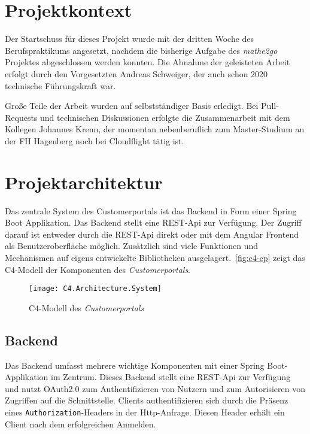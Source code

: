 \section{Projektkontext}

Der Startschuss für dieses Projekt wurde mit der dritten Woche des Berufspraktikums angesetzt, nachdem die bisherige Aufgabe des \textit{mathe2go} Projektes abgeschlossen werden konnten. Die Abnahme der geleisteten Arbeit erfolgt durch den Vorgesetzten Andreas Schweiger, der auch schon 2020 technische Führungskraft war.

Große Teile der Arbeit wurden auf selbstständiger Basis erledigt. Bei Pull-Requests und technischen Diskussionen erfolgte die Zusammenarbeit mit dem Kollegen Johannes Krenn, der momentan nebenberuflich zum Master-Studium an der FH Hagenberg noch bei Cloudflight tätig ist.

\section{Projektarchitektur}

Das zentrale System des Customerportals ist das Backend in Form einer Spring Boot Applikation. Das Backend stellt eine REST-Api zur Verfügung. Der Zugriff darauf ist entweder durch die REST-Api direkt oder mit dem Angular Frontend als Benutzeroberfläche möglich. Zusätzlich sind viele Funktionen und Mechanismen auf eigens entwickelte Bibliotheken ausgelagert.~\autoref{fig:c4-cp} zeigt das C4-Modell der Komponenten des \textit{Customerportals}.

\begin{figure}[h]
    \caption{C4-Modell des \textit{Customerportals}}
    \centering
    \texttt{[image: C4.Architecture.System]}
    \label{fig:c4-cp}
\end{figure}

\subsection{Backend}

Das Backend umfasst mehrere wichtige Komponenten mit einer Spring Boot-Applikation im Zentrum. Dieses Backend stellt eine REST-Api zur Verfügung und nutzt OAuth2.0 zum Authentifizieren von Nutzern und zum Autorisieren von Zugriffen auf die Schnittstelle. Clients authentifizieren sich durch die Präsenz eines \texttt{Authorization}-Headers in der Http-Anfrage. Diesen Header erhält ein Client nach dem erfolgreichen Anmelden.

